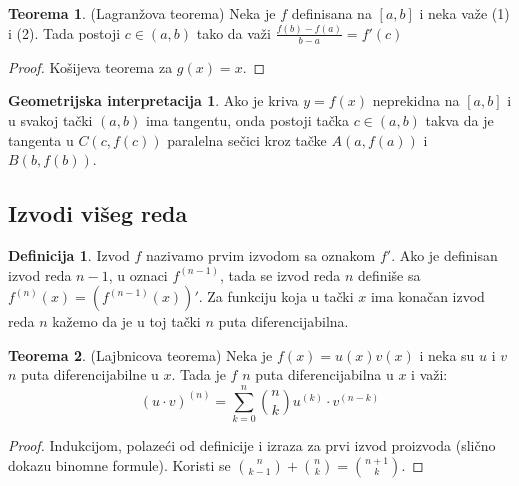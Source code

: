 \documentclass{article}
\theoremstyle{definition}
\newtheorem{definition}{Definicija}[section]
\newtheorem{ginterpretation}{Geometrijska interpretacija}[section]
\newtheorem{theorem}{Teorema}[section]
\begin{document}
        \begin{theorem}
            (Lagranžova teorema) Neka je $f$ definisana na $[a, b]$ i neka važe (1) i (2). Tada postoji $c \in (a, b)$ tako da važi $\frac{f(b) - f(a)}{b - a} = f'(c)$
        \end{theorem}
        \begin{proof}
            Košijeva teorema za $g(x) = x$.
        \end{proof}
        \begin{ginterpretation}
            Ako je kriva $y = f(x)$ neprekidna na $[a, b]$ i u svakoj tački $(a, b)$ ima tangentu, onda postoji tačka $c \in (a, b)$ takva da je tangenta u $C(c, f(c))$ paralelna sečici kroz tačke $A(a, f(a))$ i $B(b, f(b))$.
        \end{ginterpretation}

        \subsection{Izvodi višeg reda}
            \begin{definition}
                Izvod $f$ nazivamo prvim izvodom sa oznakom $f'$. Ako je definisan izvod reda $n - 1$, u oznaci $f^{(n-1)}$, tada se izvod reda $n$ definiše sa $f^{(n)}(x) = (f^{(n-1)}(x))'$. Za funkciju koja u tački $x$ ima konačan izvod reda $n$ kažemo da je u toj tački $n$ puta diferencijabilna.
            \end{definition}

            \begin{theorem}
                (Lajbnicova teorema) Neka je $f(x) = u(x)v(x)$ i neka su $u$ i $v$ $n$ puta diferencijabilne u $x$. Tada je $f$ $n$ puta diferencijabilna u $x$ i važi:
                $$(u \cdot v)^{(n)} = \sum_{k = 0}^{n} \binom{n}{k}u^{(k)} \cdot v^{(n-k)}$$
            \end{theorem}
            \begin{proof}
                Indukcijom, polazeći od definicije i izraza za prvi izvod proizvoda (slično dokazu binomne formule). Koristi se $\binom{n}{k - 1} + \binom{n}{k} = \binom{n + 1}{k}$.
            \end{proof}
\end{document}
